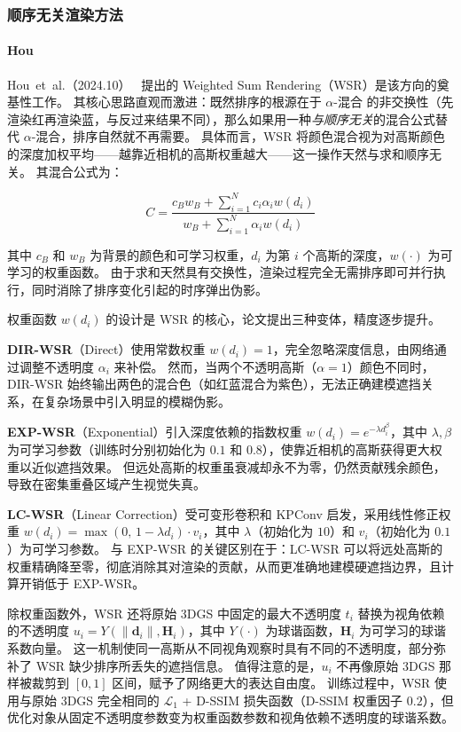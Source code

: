 \subsubsection{顺序无关渲染方法}

\paragraph{Hou}
Hou~et~al.（2024.10）~\cite{2410_18931} 提出的 Weighted Sum Rendering（WSR）是该方向的奠基性工作。
其核心思路直观而激进：既然排序的根源在于 $\alpha$-混合 的非交换性（先渲染红再渲染蓝，与反过来结果不同），那么如果用一种\emph{与顺序无关}的混合公式替代 $\alpha$-混合，排序自然就不再需要。
具体而言，WSR 将颜色混合视为对高斯颜色的深度加权平均——越靠近相机的高斯权重越大——这一操作天然与求和顺序无关。
其混合公式为：

\begin{equation}
C = \frac{c_B w_B + \sum_{i=1}^{N} c_i \alpha_i w(d_i)}{w_B + \sum_{i=1}^{N} \alpha_i w(d_i)}
\end{equation}

其中 $c_B$ 和 $w_B$ 为背景的颜色和可学习权重，$d_i$ 为第 $i$ 个高斯的深度，$w(\cdot)$ 为可学习的权重函数。
由于求和天然具有交换性，渲染过程完全无需排序即可并行执行，同时消除了排序变化引起的时序弹出伪影。

权重函数 $w(d_i)$ 的设计是 WSR 的核心，论文提出三种变体，精度逐步提升。

\textbf{DIR-WSR}（Direct）使用常数权重 $w(d_i) = 1$，完全忽略深度信息，由网络通过调整不透明度 $\alpha_i$ 来补偿。
然而，当两个不透明高斯（$\alpha = 1$）颜色不同时，DIR-WSR 始终输出两色的混合色（如红蓝混合为紫色），无法正确建模遮挡关系，在复杂场景中引入明显的模糊伪影。

\textbf{EXP-WSR}（Exponential）引入深度依赖的指数权重 $w(d_i) = e^{-\lambda d_i^\beta}$，其中 $\lambda, \beta$ 为可学习参数（训练时分别初始化为 $0.1$ 和 $0.8$），使靠近相机的高斯获得更大权重以近似遮挡效果。
但远处高斯的权重虽衰减却永不为零，仍然贡献残余颜色，导致在密集重叠区域产生视觉失真。

\textbf{LC-WSR}（Linear Correction）受可变形卷积和 KPConv 启发，采用线性修正权重 $w(d_i) = \max(0,\, 1 - \lambda d_i) \cdot v_i$，其中 $\lambda$（初始化为 $10$）和 $v_i$（初始化为 $0.1$）为可学习参数。
与 EXP-WSR 的关键区别在于：LC-WSR 可以将远处高斯的权重精确降至零，彻底消除其对渲染的贡献，从而更准确地建模硬遮挡边界，且计算开销低于 EXP-WSR。

除权重函数外，WSR 还将原始 3DGS 中固定的最大不透明度 $t_i$ 替换为视角依赖的不透明度 $u_i = Y(\|\mathbf{d}_i\|, \mathbf{H}_i)$，其中 $Y(\cdot)$ 为球谐函数，$\mathbf{H}_i$ 为可学习的球谐系数向量。
这一机制使同一高斯从不同视角观察时具有不同的不透明度，部分弥补了 WSR 缺少排序所丢失的遮挡信息。
值得注意的是，$u_i$ 不再像原始 3DGS 那样被裁剪到 $[0,1]$ 区间，赋予了网络更大的表达自由度。
训练过程中，WSR 使用与原始 3DGS 完全相同的 $\mathcal{L}_1$ + D-SSIM 损失函数（D-SSIM 权重因子 $0.2$），但优化对象从固定不透明度参数变为权重函数参数和视角依赖不透明度的球谐系数。

